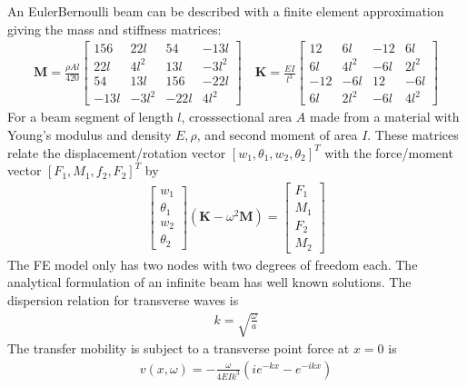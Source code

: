 \documentclass[letterpaper,10pt,english]{sphinxmanual}
\begin{document}
\sphinxAtStartPar
An Euler\sphinxhyphen{}Bernoulli beam can be described with a finite element approximation giving the mass and stiffness matrices:
\begin{equation*}
\begin{split}\mathbf{M}=\frac{\rho A l}{420}\left[\begin{array}{cccc}
156 & 22 l & 54 & -13 l \\
22 l & 4 l^2 & 13 l & -3 l^2 \\
54 & 13 l & 156 & -22 l \\
-13 l & -3 l^2 & -22 l & 4 l^2
\end{array}\right] \quad\mathbf{K}=\frac{E I}{l^3}\left[\begin{array}{cccc}
12 & 6 l & -12 & 6 l \\
6 l & 4 l^2 & -6 l & 2 l^2 \\
-12 & -6 l & 12 & -6 l \\
6 l & 2 l^2 & -6 l & 4 l^2
\end{array}\right]\end{split}
\end{equation*}
\sphinxAtStartPar
For a beam segment of length \(l\), cross\sphinxhyphen{}sectional area \(A\) made from a material with Young’s modulus and density \(E, \rho\), and second moment of area \(I\).
These matrices relate the displacement/rotation vector \([w_1, \theta_1, w_2, \theta_2]^T\) with the force/moment vector \([F_1, M_1, f_2, F_2]^T\) by
\begin{equation*}
\begin{split}\begin{bmatrix}
w_1\\
\theta_1\\
w_2\\
\theta_2
\end{bmatrix} \left(\mathbf{K} - \omega^2 \mathbf{M} \right) = \begin{bmatrix} F_1\\
M_1\\
F_2\\
M_2
\end{bmatrix}\end{split}
\end{equation*}
\sphinxAtStartPar
The FE model only has two nodes with two degrees of freedom each. The analytical formulation of an infinite beam has well known solutions.
The dispersion relation for transverse waves is
\begin{equation*}
\begin{split}k = \sqrt{ \frac{\omega}{a} }\end{split}
\end{equation*}
\sphinxAtStartPar
The transfer mobility is subject to a transverse point force at \(x=0\) is
\begin{equation*}
\begin{split}v(x, \omega)=-\frac{\omega}{4 E I k^3}\left(i e^{-k x}-e^{-i k x}\right)\end{split}
\end{equation*}
\end{document}
